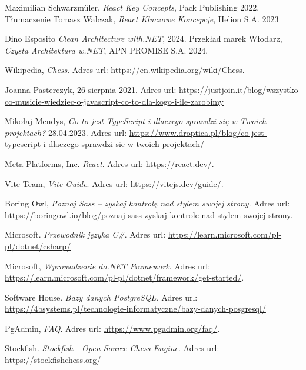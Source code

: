 \documentclass[twoside]{projektInzynierskiMS1}
\begin{document}
\newpage
\begin{thebibliography}{99}

    Maximilian Schwarzmüler, \textit{React Key Concepts}, Pack Publishing 2022. Tłumaczenie Tomasz Walczak, \textit{React Kluczowe Koncepcje}, Helion S.A. 2023

    Dino Esposito \textit{Clean Architecture with.NET}, 2024. Przekład marek Włodarz, \textit{Czysta Architektura w.NET}, APN PROMISE S.A. 2024.

    Wikipedia, \textit{Chess}. Adres url: \url{https://en.wikipedia.org/wiki/Chess}.

    Joanna Pasterczyk, 26 sierpnia 2021. Adres url: \url{https://justjoin.it/blog/wszystko-co-musicie-wiedziec-o-javascript-co-to-dla-kogo-i-ile-zarobimy}

    Mikołaj Mendys, \textit{Co to jest TypeScript i dlaczego sprawdzi się w Twoich projektach?} 28.04.2023. Adres url: \url{https://www.droptica.pl/blog/co-jest-typescript-i-dlaczego-sprawdzi-sie-w-twoich-projektach/}

    Meta Platforms, Inc. \textit{React}. Adres url: \url{https://react.dev/}.

    Vite Team, \textit{Vite Guide}. Adres url: \url{https://vitejs.dev/guide/}.

    Boring Owl, \textit{Poznaj Sass – zyskaj kontrolę nad stylem swojej strony}. Adres url: \url{https://boringowl.io/blog/poznaj-sass-zyskaj-kontrole-nad-stylem-swojej-strony}.

    Microsoft. \textit{Przewodnik języka C\#}. Adres url:  \url{https://learn.microsoft.com/pl-pl/dotnet/csharp/}

    Microsoft, \textit{Wprowadzenie do.NET Framework}. Adres url: \url{https://learn.microsoft.com/pl-pl/dotnet/framework/get-started/}.

    Software House. \textit{Bazy danych PostgreSQL.} Adres url: \url{https://4bsystems.pl/technologie-informatyczne/bazy-danych-posgresql/}

    PgAdmin, \textit{FAQ}. Adres url: \url{https://www.pgadmin.org/faq/}.

    Stockfish. \textit{Stockfish - Open Source Chess Engine}. Adres url:  \url{https://stockfishchess.org/}


\end{thebibliography}
\end{document}
